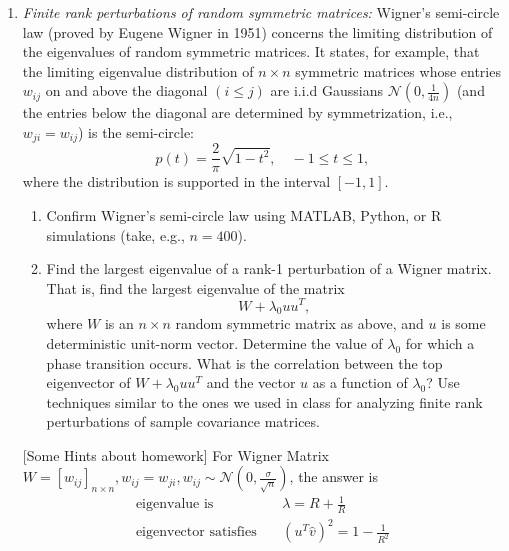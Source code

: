 \documentclass[11pt]{article}
\begin{document}
\begin{enumerate}
\item {\em Finite rank perturbations of random symmetric matrices:} Wigner's semi-circle law (proved by Eugene Wigner in 1951) concerns the limiting distribution of the eigenvalues of random symmetric matrices. It states, for example, that the limiting eigenvalue distribution of $n\times n$ symmetric matrices whose entries $w_{ij}$ on and above the diagonal $(i\leq j)$ are i.i.d Gaussians $\mathcal{N}(0,\frac{1}{4n})$ (and the entries below the diagonal are determined by symmetrization, i.e., $w_{ji}=w_{ij}$) is the semi-circle:
    $$p(t) = \frac{2}{\pi} \sqrt{1-t^2}, \quad -1\leq t \leq 1,$$
    where the distribution is supported in the interval $[-1,1]$.
\begin{enumerate}
\item Confirm Wigner's semi-circle law using MATLAB, Python, or R simulations (take, e.g., $n=400$).
\item Find the largest eigenvalue of a rank-1 perturbation of a Wigner matrix. That is, find the largest eigenvalue of the matrix $$W + \lambda_0 uu^T,$$ where $W$ is an $n\times n$ random symmetric matrix as above, and $u$ is some deterministic unit-norm vector. Determine the value of $\lambda_0$ for which a phase transition occurs. What is the correlation between the top eigenvector of $W+\lambda_0 uu^T$ and the vector $u$ as a function of $\lambda_0$? Use techniques similar to the ones we used in class for analyzing finite rank perturbations of sample covariance matrices.
\end{enumerate} 

[Some Hints about homework] For Wigner Matrix\ $W=[w_{ij}]_{n\times n},w_{ij}=w_{ji},w_{ij}\sim {\mathcal N}(0,\frac{\sigma}{\sqrt{n}})$, 
 the answer is
$$
\begin{array}{rcl}
\textrm{eigenvalue\ is}\ & &\lambda=R+\frac{1}{R}\\
\textrm{eigenvector\ satisfies}\ && (u^{T}\hat{v})^{2}=1-\frac{1}{R^{2}} \\
\end{array}
$$



\end{enumerate}
\end{document}
